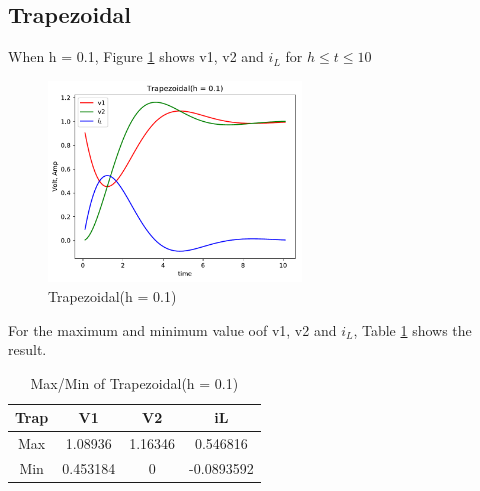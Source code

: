 \documentclass{article}
\begin{document}
\subsection{Trapezoidal}
When h = 0.1, Figure \ref{fig:trap 01} shows v1, v2 and $i_L$ for $h \leq t \leq 10$
\begin{figure}[H]
    \centering
    \includegraphics[width=0.6\textwidth]{src/trap_01.pdf}
    \caption{Trapezoidal(h = 0.1)}
    \label{fig:trap 01}
\end{figure}
For the maximum and minimum value oof v1, v2 and $i_L$, Table \ref{tab:trap 01} shows the result.
\begin{table}[H]
    \begin{center}
        \begin{tabular}{|c|c|c|c|}
            \hline
            Trap & V1 & V2 & iL \\ \hline
            Max & 1.08936 & 1.16346 & 0.546816 \\ \hline
            Min & 0.453184 & 0 & -0.0893592 \\ \hline
        \end{tabular}
    \end{center}
    \caption{Max/Min of Trapezoidal(h = 0.1)}
    \label{tab:trap 01}
\end{table}
\end{document}
